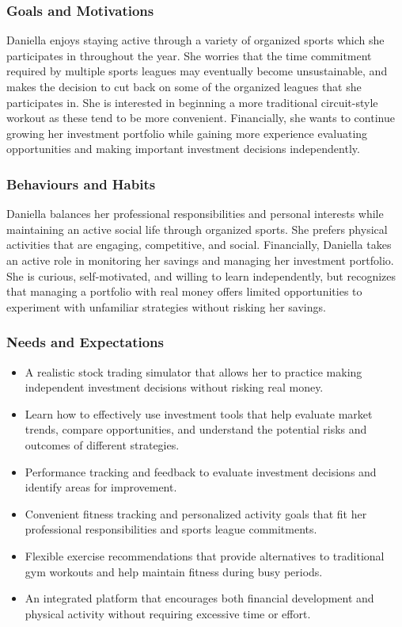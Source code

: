 \documentclass[12pt]{article}
\begin{document}
\subsubsection*{Goals and Motivations}
Daniella enjoys staying active through a variety of organized sports which she participates in throughout the year. She worries that the time commitment required by multiple sports leagues may eventually become unsustainable, and makes the decision to cut back on some of the organized leagues that she participates in. She is interested in beginning a more traditional circuit-style workout as these tend to be more convenient. Financially, she wants to continue growing her investment portfolio while gaining more experience evaluating opportunities and making important investment decisions independently.

\subsubsection*{Behaviours and Habits}
Daniella balances her professional responsibilities and personal interests while maintaining an active social life through organized sports. She prefers physical activities that are engaging, competitive, and social. Financially, Daniella takes an active role in monitoring her savings and managing her investment portfolio. She is curious, self-motivated, and willing to learn independently, but recognizes that managing a portfolio with real money offers limited opportunities to experiment with unfamiliar strategies without risking her savings.

\subsubsection*{Needs and Expectations}
\begin{itemize}
    \item A realistic stock trading simulator that allows her to practice making independent investment decisions without risking real money.
    \item Learn how to effectively use investment tools that help evaluate market trends, compare opportunities, and understand the potential risks and outcomes of different strategies.
    \item Performance tracking and feedback to evaluate investment decisions and identify areas for improvement.
    \item Convenient fitness tracking and personalized activity goals that fit her professional responsibilities and sports league commitments.
    \item Flexible exercise recommendations that provide alternatives to traditional gym workouts and help maintain fitness during busy periods.
    \item An integrated platform that encourages both financial development and physical activity without requiring excessive time or effort.
\end{itemize}
\end{document}
